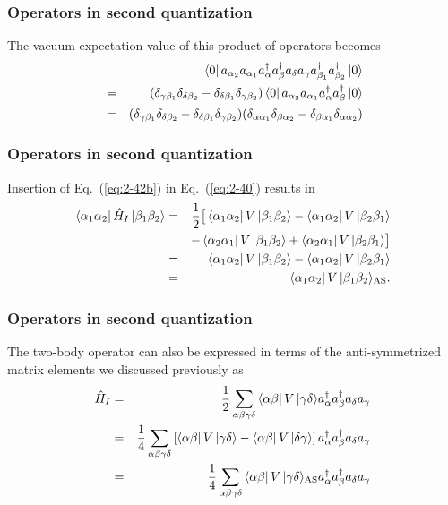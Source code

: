 \frame
{
  \frametitle{Operators in second quantization}
\begin{small}
{\scriptsize
The vacuum expectation value of this product of operators becomes
\begin{eqnarray}
	&& \element{0}{a_{\alpha_2} a_{\alpha_1} a^\dagger_\alpha a^\dagger_\beta a_\delta a_\gamma 
		a_{\beta_1}^\dagger a_{\beta_2}^\dagger}{0} \nonumber \\
	&=& (\delta_{\gamma \beta_1} \delta_{\delta \beta_2} -
		\delta_{\delta \beta_1} \delta_{\gamma \beta_2} ) 
		\element{0}{a_{\alpha_2} a_{\alpha_1}a^\dagger_\alpha a^\dagger_\beta}{0} \nonumber \\
	&=& (\delta_{\gamma \beta_1} \delta_{\delta \beta_2} -\delta_{\delta \beta_1} \delta_{\gamma \beta_2} )
	(\delta_{\alpha \alpha_1} \delta_{\beta \alpha_2} -\delta_{\beta \alpha_1} \delta_{\alpha \alpha_2} ) \label{eq:2-42b}
\end{eqnarray}
}
\end{small}
}

\frame
{
  \frametitle{Operators in second quantization}
\begin{small}
{\scriptsize
Insertion of 
Eq.~(\ref{eq:2-42b}) in Eq.~(\ref{eq:2-40}) results in
\begin{eqnarray}
	\element{\alpha_1\alpha_2}{\hat{H}_I}{\beta_1\beta_2} &=& \frac{1}{2} \big[ 
		\element{\alpha_1\alpha_2}{V}{\beta_1\beta_2} - \element{\alpha_1\alpha_2}{V}{\beta_2\beta_1} \nonumber \\
		&& - \element{\alpha_2\alpha_1}{V}{\beta_1\beta_2} + \element{\alpha_2\alpha_1}{V}{\beta_2\beta_1} \big] \nonumber \\
	&=& \element{\alpha_1\alpha_2}{V}{\beta_1\beta_2} - \element{\alpha_1\alpha_2}{V}{\beta_2\beta_1} \nonumber \\
	&=& \element{\alpha_1\alpha_2}{V}{\beta_1\beta_2}_{\mathrm{\mathrm{\mathrm{AS}}}}. \label{eq:2-43b}
\end{eqnarray}
}
\end{small}
}


\frame
{
  \frametitle{Operators in second quantization}
\begin{small}
{\scriptsize
The two-body operator can also be expressed in terms of the anti-symmetrized matrix elements we discussed previously as
\begin{eqnarray}
	\hat{H}_I &=& \frac{1}{2} \sum_{\alpha\beta\gamma\delta}  \element{\alpha \beta}{V}{\gamma \delta}
		a_\alpha^\dagger a_\beta^\dagger a_\delta a_\gamma \nonumber \\
	&=& \frac{1}{4} \sum_{\alpha\beta\gamma\delta} \left[ \element{\alpha \beta}{V}{\gamma \delta} -
		\element{\alpha \beta}{V}{\delta\gamma } \right] 
		a_\alpha^\dagger a_\beta^\dagger a_\delta a_\gamma \nonumber \\
	&=& \frac{1}{4} \sum_{\alpha\beta\gamma\delta} \element{\alpha \beta}{V}{\gamma \delta}_{\mathrm{\mathrm{AS}}}
		a_\alpha^\dagger a_\beta^\dagger a_\delta a_\gamma \label{eq:2-45}
\end{eqnarray}
}
\end{small}
}



